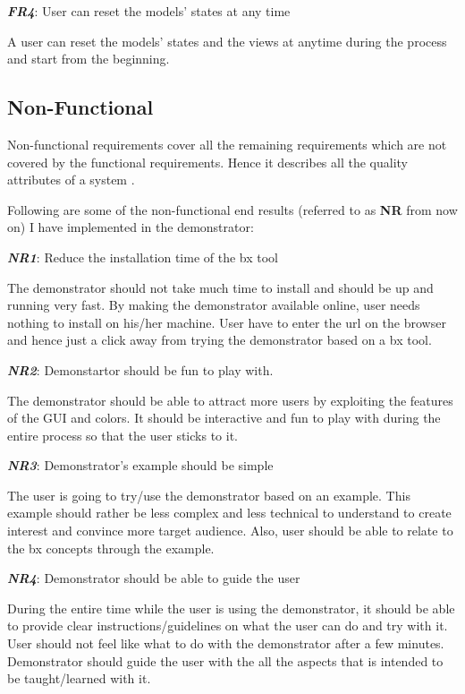 \textbf{\textit{FR4}}: User can reset the models' states at any time

A user can reset the models' states and the views at anytime during the process and start from the beginning.

\subsection{Non-Functional}\label{subsec:nonfunctionalreq}
Non-functional requirements cover all the remaining requirements which are not covered by the functional requirements. Hence it describes all the quality attributes of a system \cite{funcandnonfuncreq}.

Following are some of the non-functional end results (referred to as \textbf{NR} from now on) I have implemented in the demonstrator:

\textbf{\textit{NR1}}: Reduce the installation time of the bx tool

The demonstrator should not take much time to install and should be up and running very fast. By making the demonstrator available online, user needs nothing to install on his/her machine. User have to enter the url on the browser and hence just a click away from trying the demonstrator based on a bx tool.

\textbf{\textit{NR2}}: Demonstartor should be fun to play with.

The demonstrator should be able to attract more users by exploiting the features of the GUI and colors. It should be interactive and fun to play with during the entire process so that the user sticks to it.

\textbf{\textit{NR3}}: Demonstrator's example should be simple

The user is going to try/use the demonstrator based on an example. This example should rather be less complex and less technical to understand to create interest and convince more target audience. Also, user should be able to relate to the bx concepts through the example.

\textbf{\textit{NR4}}: Demonstrator should be able to guide the user

During the entire time while the user is using the demonstrator, it should be able to provide clear instructions/guidelines on what the user can do and try with it. User should not feel like what to do with the demonstrator after a few minutes. Demonstrator should guide the user with the all the aspects that is intended to be taught/learned with it.

